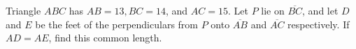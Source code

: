 Triangle $A B C$ has $A B=13, B C=14$, and $A C=15$. Let $P$ lie on $\overline{B C}$, and let $D$ and $E$ be the feet of the perpendiculars from $P$ onto $\overline{A B}$ and $\overline{A C}$ respectively. If $A D=A E$, find this common length.